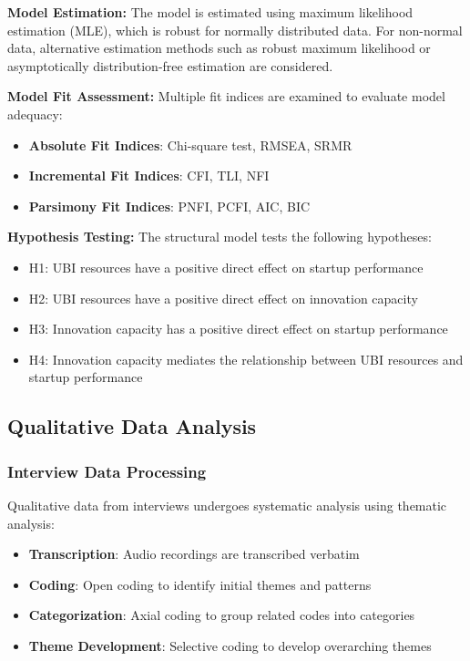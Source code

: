 \documentclass[../Main.tex]{subfiles}%
\begin{document}
	\textbf{Model Estimation:}
	The model is estimated using maximum likelihood estimation (MLE), which is robust for normally distributed data. For non-normal data, alternative estimation methods such as robust maximum likelihood or asymptotically distribution-free estimation are considered.
	
	\textbf{Model Fit Assessment:}
	Multiple fit indices are examined to evaluate model adequacy:
	\begin{itemize}
		\item \textbf{Absolute Fit Indices}: Chi-square test, RMSEA, SRMR
		\item \textbf{Incremental Fit Indices}: CFI, TLI, NFI
		\item \textbf{Parsimony Fit Indices}: PNFI, PCFI, AIC, BIC
	\end{itemize}
	
	\textbf{Hypothesis Testing:}
	The structural model tests the following hypotheses:
	\begin{itemize}
		\item H1: UBI resources have a positive direct effect on startup performance
		\item H2: UBI resources have a positive direct effect on innovation capacity
		\item H3: Innovation capacity has a positive direct effect on startup performance
		\item H4: Innovation capacity mediates the relationship between UBI resources and startup performance
	\end{itemize}
	
	\subsection{Qualitative Data Analysis}
	
	\subsubsection{Interview Data Processing}
	Qualitative data from interviews undergoes systematic analysis using thematic analysis:
	\begin{itemize}
		\item \textbf{Transcription}: Audio recordings are transcribed verbatim
		\item \textbf{Coding}: Open coding to identify initial themes and patterns
		\item \textbf{Categorization}: Axial coding to group related codes into categories
		\item \textbf{Theme Development}: Selective coding to develop overarching themes
	\end{itemize}
	
\end{document}
